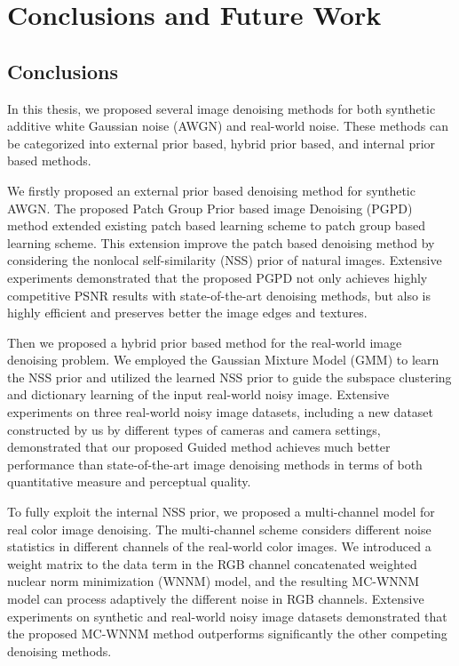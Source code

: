 %
\chapter{Conclusions and Future Work}
\label{sec:conclusions}


\section{Conclusions}
\label{sec:conclusions:sec1}
In this thesis, we proposed several image denoising methods for both synthetic additive white Gaussian noise (AWGN) and real-world noise. These methods can be categorized into external prior based, hybrid prior based, and internal prior based methods.

We firstly proposed an external prior based denoising method for synthetic AWGN. The proposed Patch Group Prior based image Denoising (PGPD) method extended existing patch based learning scheme \cite{epll} to patch group based learning scheme. This extension improve the patch based denoising method by considering the nonlocal self-similarity (NSS) prior of natural images. Extensive experiments demonstrated that the proposed PGPD not only achieves highly competitive PSNR results with state-of-the-art denoising methods, but also is highly efficient and preserves better the image edges and textures.

Then we proposed a hybrid prior based method for the real-world image denoising problem. We employed the Gaussian Mixture Model (GMM) to learn the NSS prior and utilized the learned NSS prior to guide the subspace clustering and dictionary learning of the input real-world noisy image. Extensive experiments on three real-world noisy image datasets, including a new dataset constructed by us by different types of cameras and camera settings, demonstrated that our proposed Guided method achieves much better performance than state-of-the-art image denoising methods in terms of both quantitative measure and perceptual quality.

To fully exploit the internal NSS prior, we proposed a multi-channel model for real color image denoising. The multi-channel scheme considers different noise statistics in different channels of the real-world color images. We introduced a weight matrix to the data term in the RGB channel concatenated weighted nuclear norm minimization (WNNM) model, and the resulting MC-WNNM model can process adaptively the different noise in RGB channels. Extensive experiments on synthetic and real-world noisy image datasets demonstrated that the proposed MC-WNNM method outperforms significantly the other competing denoising methods.

